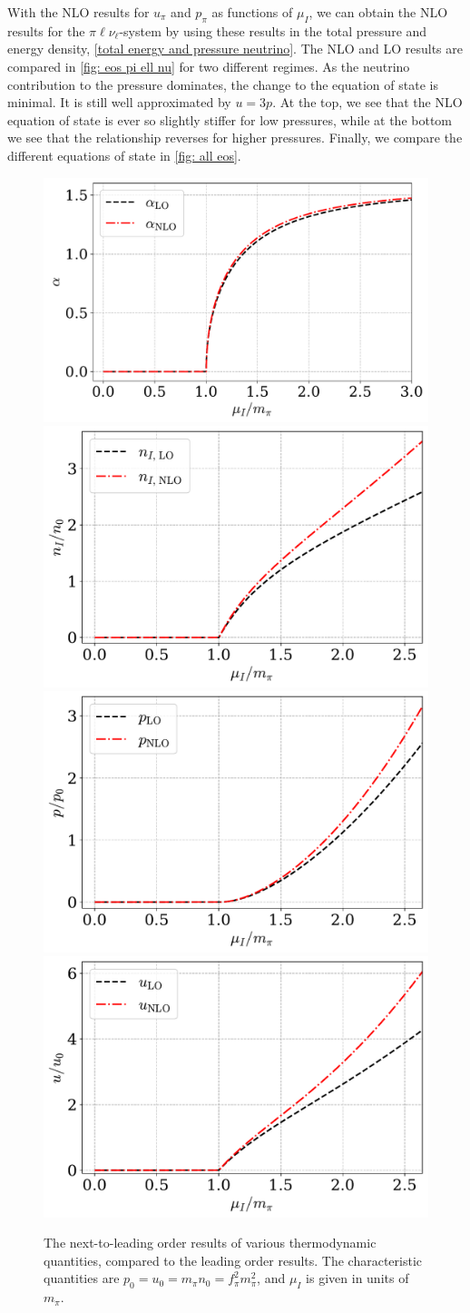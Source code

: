 With the NLO results for $u_\pi$ and $p_\pi$ as functions of $\mu_I$, we can obtain the NLO results for the $\pi\ell\nu_\ell$-system by using these results in the total pressure and energy density, \autoref{total energy and pressure neutrino}.
The NLO and LO results are compared in \autoref{fig: eos pi ell nu} for two different regimes.
As the neutrino contribution to the pressure dominates, the change to the equation of state is minimal.
It is still well approximated by $u = 3p$.
At the top, we see that the NLO equation of state is ever so slightly stiffer for low pressures, while at the bottom we see that the relationship reverses for higher pressures.
Finally, we compare the different equations of state in \autoref{fig: all eos}.

\begin{figure}[!htb]
    \centering
    \includegraphics[width=.51\textwidth]{../scripts/figurer/pion_nlo_alpha.pdf}
    \includegraphics[width=.48\textwidth]{../scripts/figurer/pion_nlo_nI_945.pdf}
    \includegraphics[width=.49\textwidth]{../scripts/figurer/pion_nlo_p_945.pdf}
    \includegraphics[width=.49\textwidth]{../scripts/figurer/pion_nlo_u_945.pdf}
    \caption{The next-to-leading order results of various thermodynamic quantities, compared to the leading order results. The characteristic quantities are $p_0 = u_0 = m_\pi n_0 = f_\pi^2 m_\pi^2$, and $\mu_I$ is given in units of $m_\pi$.}
    \label{fig: nlo quantitites}
\end{figure}


